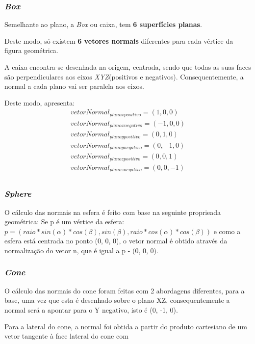 \documentclass[relatorio.tex]{subfiles}
\begin{document}
\subsubsection{\textit{Box}}

Semelhante ao plano, a \textit{Box} ou caixa, 
tem \textbf{6 superfícies planas}.

Deste modo, só existem \textbf{6 vetores normais} 
diferentes para cada vértice da figura geométrica.

A caixa encontra-se desenhada na origem, centrada,
sendo que todas as suas faces são perpendiculares
aos eixos \textit{XYZ}(positivos e negativos).
Consequentemente, a normal a cada plano vai ser 
paralela aos eixos.

Deste modo, apresenta:
\begin{eqnarray}
    vetorNormal_{plano x positivo} = (1,0,0) \\
    vetorNormal_{plano x negativo} = (-1,0,0) \\
    vetorNormal_{plano y positivo} = (0,1,0) \\
    vetorNormal_{plano y negativo} = (0,-1,0) \\
    vetorNormal_{plano z positivo} = (0,0,1) \\
    vetorNormal_{plano z negativo} = (0,0,-1) \\
\end{eqnarray}

\subsubsection{\textit{Sphere}}
O cálculo das normais na esfera é feito com base na seguinte proprieada
geométrica:
Se p é um vértice da esfera:
$ p = (raio * sin(\alpha) * cos(\beta), sin(\beta), raio * cos(\alpha) * cos(\beta))$
e como a esfera está centrada no ponto (0, 0, 0), o vetor normal é obtido através
da normalização do vetor n, que é igual a p - (0, 0, 0).

\subsubsection{\textit{Cone}}
O cálculo das normais do cone foram feitas com 2 abordagens diferentes,
para a base, uma vez que esta é desenhado sobre o plano XZ, consequentemente
a normal será a apontar para o Y negativo, isto é (0, -1, 0).

Para a lateral do cone, a normal foi obtida a partir do produto cartesiano
de um vetor tangente à face lateral do cone com 
\end{document}
